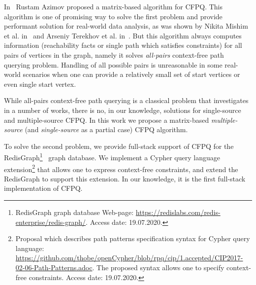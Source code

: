 In~\cite{Azimov:2018:CPQ:3210259.3210264} Rustam Azimov proposed a matrix-based algorithm for CFPQ.
This algorithm is one of promising way to solve the first problem and provide performant solution for real-world data analysis, as was shown by Nikita Mishim et al. in~\cite{Mishin:2019:ECP:3327964.3328503} and Arseniy Terekhov et al. in~\cite{10.1145/3398682.3399163}. 
But this algorithm always computes information (reachability facts or single path which satisfies constraints) for all pairs of vertices in the graph, namely it solves \textit{all-pairs} context-free path querying problem.
Handling of all possible pairs is unreasonable in some real-world scenarios when one can provide a relatively small set of start vertices or even single start vertex. 

While all-pairs context-free path querying is a classical problem that investigates in a number of works, there is no, in our knowledge, solutions for single-source and multiple-source CFPQ.
In this work we propose a matrix-based \textit{multiple-source} (and \textit{single-source} as a partial case) CFPQ algorithm.

To solve the second problem, we provide full-stack support of CFPQ for the RedisGraph\footnote{RedisGraph graph database Web-page: \url{https://redislabs.com/redis-enterprise/redis-graph/}. Access date: 19.07.2020.}~\cite{8778293} graph database.
We implement a Cypher query language extension\footnote{Proposal which describes path patterns specification syntax for Cypher query language: \url{https://github.com/thobe/openCypher/blob/rpq/cip/1.accepted/CIP2017-02-06-Path-Patterns.adoc}. The proposed syntax allows one to specify context-free constraints. Access date: 19.07.2020.} that allows one to express context-free constraints, and extend the RedisGraph to support this extension.
In our knowledge, it is the first full-stack implementation of CFPQ.


